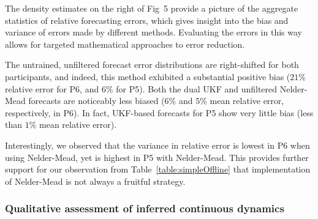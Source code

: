 \documentclass[10pt,letterpaper]{article}
\begin{document}
The density estimates on the right of Fig~5 provide a picture of the aggregate statistics of relative forecasting errors, which gives insight into the bias and variance of errors made by different methods. Evaluating the errors in this way allows for targeted mathematical approaches to error reduction.

The untrained, unfiltered forecast error distributions are right-shifted for both participants, and indeed, this method exhibited a substantial positive bias ($21\%$ relative error for P6, and $6\%$ for P5). Both the dual UKF and unfiltered Nelder-Mead forecasts are noticeably less biased ($6\%$ and $5\%$ mean relative error, respectively, in P6). In fact, UKF-based forecasts for P5 show very little bias (less than $1\%$ mean relative error). 

Interestingly, we observed that the variance in relative error is lowest in P6 when using Nelder-Mead, yet is highest in P5 with Nelder-Mead. This provides further support for our observation from Table~\ref{table:simpleOffline} that implementation of Nelder-Mead is not always a fruitful strategy.


\subsubsection{Qualitative assessment of inferred continuous dynamics}
\end{document}
